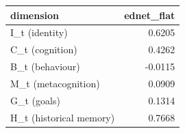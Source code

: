 \begin{tabular}{lr}
\toprule
dimension & ednet\_flat \\
\midrule
I\_t (identity) & 0.6205 \\
C\_t (cognition) & 0.4262 \\
B\_t (behaviour) & -0.0115 \\
M\_t (metacognition) & 0.0909 \\
G\_t (goals) & 0.1314 \\
H\_t (historical memory) & 0.7668 \\
\bottomrule
\end{tabular}
